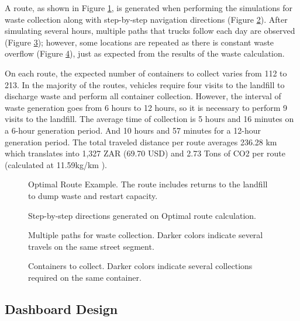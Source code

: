 \documentclass[authoryear,preprint,review,12pt]{elsarticle}
\begin{document}
    A route, as shown in Figure \ref{fig:road3}, is generated when performing the simulations for waste collection along with step-by-step navigation directions (Figure \ref{fig:road4}). After simulating several hours, multiple paths that trucks follow each day are observed (Figure \ref{fig:road5}); however, some locations are repeated as there is constant waste overflow (Figure \ref{fig:road6}), just as expected from the results of the waste calculation.

    On each route, the expected number of containers to collect varies from 112 to 213. In the majority of the routes, vehicles require four visits to the landfill to discharge waste and perform all container collection. However, the interval of waste generation goes from 6 hours to 12 hours, so it is necessary to perform 9 visits to the landfill. The average time of collection is 5 hours and 16 minutes on a 6-hour generation period. And 10 hours and 57 minutes for a 12-hour generation period. The total traveled distance per route averages 236.28 km which translates into 1,327 ZAR (69.70 USD) and 2.73 Tons of CO2 per route (calculated at 11.59kg/km \citep{EPA2023}).

    \begin{figure}
        \caption{Optimal Route Example. The route includes returns to the landfill to dump waste and restart capacity.}
        \label{fig:road3}
    \end{figure}

    \begin{figure}
        \caption{Step-by-step directions generated on Optimal route calculation.}
        \label{fig:road4}
    \end{figure}

    \begin{figure}
        \caption{Multiple paths for waste collection. Darker colors indicate several travels on the same street segment.}
        \label{fig:road5}
    \end{figure}

    \begin{figure}
        \caption{Containers to collect. Darker colors indicate several collections required on the same container.}
        \label{fig:road6}
    \end{figure}

    \subsection{Dashboard Design} \label{subsec:dashboard}
\end{document}
